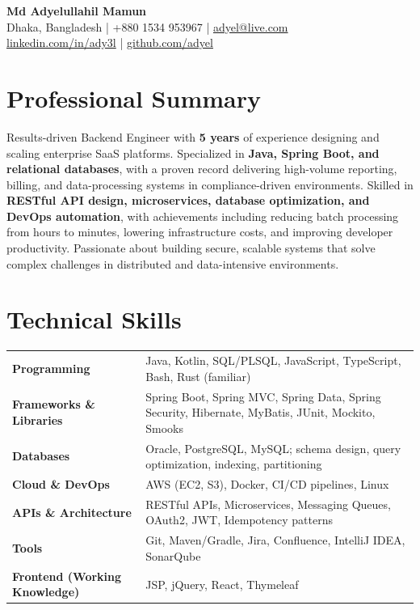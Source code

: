\documentclass[10pt,a4paper]{article}
\begin{document}
\begin{center}
    \textbf{\Huge Md Adyelullahil Mamun} \\
    \vspace{2pt}
    \small Dhaka, Bangladesh | +880 1534 953967 | \href{mailto:adyel@live.com}{adyel@live.com} \\
    \href{https://linkedin.com/in/ady3l}{linkedin.com/in/ady3l} | \href{https://github.com/adyel}{github.com/adyel}
\end{center}

\section*{Professional Summary}
Results-driven Backend Engineer with \textbf{5 years} of experience designing and scaling enterprise SaaS platforms. Specialized in \textbf{Java, Spring Boot, and relational databases}, with a proven record delivering high-volume reporting, billing, and data-processing systems in compliance-driven environments. Skilled in \textbf{RESTful API design, microservices, database optimization, and DevOps automation}, with achievements including reducing batch processing from hours to minutes, lowering infrastructure costs, and improving developer productivity. Passionate about building secure, scalable systems that solve complex challenges in distributed and data-intensive environments.

\section*{Technical Skills}
\begin{tabularx}{\textwidth}{@{}lX}
    \textbf{Programming} & Java, Kotlin, SQL/PLSQL, JavaScript, TypeScript, Bash, Rust (familiar) \\
    \textbf{Frameworks \& Libraries} & Spring Boot, Spring MVC, Spring Data, Spring Security, Hibernate, MyBatis, JUnit, Mockito, Smooks \\
    \textbf{Databases} & Oracle, PostgreSQL, MySQL; schema design, query optimization, indexing, partitioning \\
    \textbf{Cloud \& DevOps} & AWS (EC2, S3), Docker, CI/CD pipelines, Linux \\
    \textbf{APIs \& Architecture} & RESTful APIs, Microservices, Messaging Queues, OAuth2, JWT, Idempotency patterns \\
    \textbf{Tools} & Git, Maven/Gradle, Jira, Confluence, IntelliJ IDEA, SonarQube \\
    \textbf{Frontend (Working Knowledge)} & JSP, jQuery, React, Thymeleaf \\
\end{tabularx}
\end{document}
